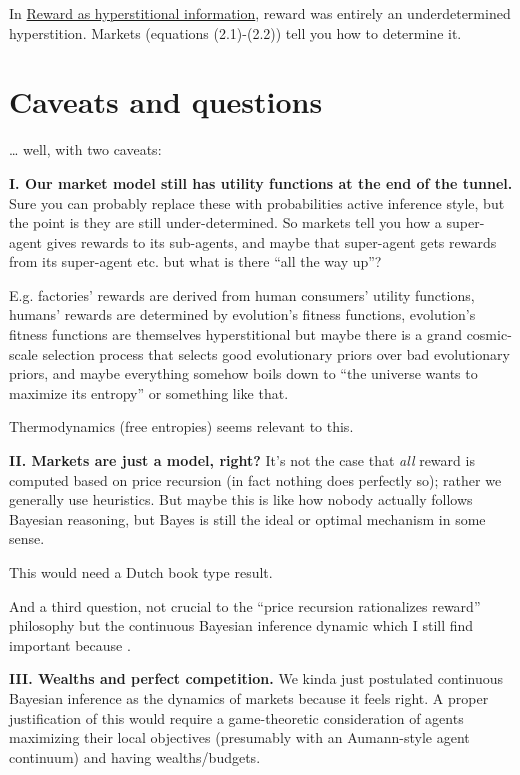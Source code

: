 In \href{https://www.lesswrong.com/posts/z7DBBn9RaDyKJRidg/reward-is-hyperstitional-information}{Reward as hyperstitional information}, reward was entirely an underdetermined hyperstition. Markets (equations (2.1)-(2.2)) tell you how to determine it.

\hypertarget{appendix-caveats-and-questions}{%
\section{Caveats and questions}\label{appendix-caveats-and-questions}}

\ldots{} well, with two caveats:

\textbf{I. Our market model still has utility functions at the end of the tunnel.} Sure you can probably replace these with probabilities active inference style, but the point is they are still under-determined. So markets tell you how a super-agent gives rewards to its sub-agents, and maybe that super-agent gets rewards from its super-agent etc. but what is there ``all the way up''?

E.g. factories' rewards are derived from human consumers' utility functions, humans' rewards are determined by evolution's fitness functions, evolution's fitness functions are themselves hyperstitional but maybe there is a grand cosmic-scale selection process that selects good evolutionary priors over bad evolutionary priors, and maybe everything somehow boils down to ``the universe wants to maximize its entropy'' or something like that.

Thermodynamics (free entropies) seems relevant to this.

\textbf{II. Markets are just a model, right?} It's not the case that \emph{all} reward is computed based on price recursion (in fact nothing does perfectly so); rather we generally use heuristics. But maybe this is like how nobody actually follows Bayesian reasoning, but Bayes is still the ideal or optimal mechanism in some sense.

This would need a Dutch book type result.

And a third question, not crucial to the ``price recursion rationalizes reward'' philosophy but the continuous Bayesian inference dynamic which I still find important because .

\textbf{III. Wealths and perfect competition.} We kinda just postulated continuous Bayesian inference as the dynamics of markets because it feels right. A proper justification of this would require a game-theoretic consideration of agents maximizing their local objectives (presumably with an Aumann-style agent continuum) and having wealths/budgets.

